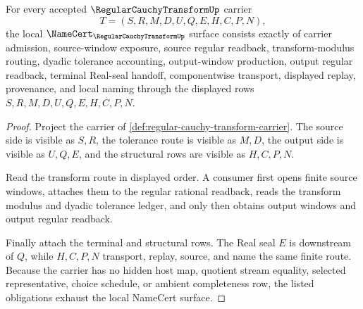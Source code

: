 \begin{theorem}
\label{thm:regular-cauchy-transform-namecert-obligations}
For every accepted $\RegularCauchyTransformUp$ carrier
$$
T=(S,R,M,D,U,Q,E,H,C,P,N),
$$
the local $\NameCert_{\RegularCauchyTransformUp}$ surface consists exactly of carrier admission, source-window exposure, source regular readback, transform-modulus routing, dyadic tolerance accounting, output-window production, output regular readback, terminal Real-seal handoff, componentwise transport, displayed replay, provenance, and local naming through the displayed rows $S,R,M,D,U,Q,E,H,C,P,N$.
\end{theorem}
\begin{proof}
Project the carrier of \autoref{def:regular-cauchy-transform-carrier}. The source side is visible as $S,R$, the tolerance route is visible as $M,D$, the output side is visible as $U,Q,E$, and the structural rows are visible as $H,C,P,N$.

Read the transform route in displayed order. A consumer first opens finite source windows, attaches them to the regular rational readback, reads the transform modulus and dyadic tolerance ledger, and only then obtains output windows and output regular readback.

Finally attach the terminal and structural rows. The Real seal $E$ is downstream of $Q$, while $H,C,P,N$ transport, replay, source, and name the same finite route. Because the carrier has no hidden host map, quotient stream equality, selected representative, choice schedule, or ambient completeness row, the listed obligations exhaust the local NameCert surface.
\end{proof}

